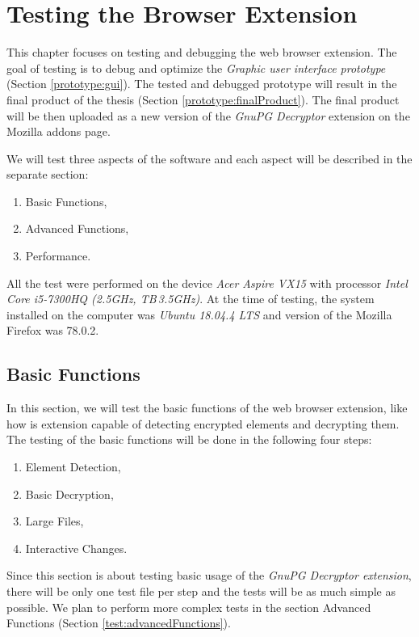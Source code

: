 \chapter{Testing the Browser Extension}
\label{test}
This chapter focuses on testing and debugging the web browser extension. The goal of testing is to debug and optimize the \textit{Graphic user interface prototype} (Section \ref{prototype:gui}). The tested and debugged prototype will result in the final product of the thesis (Section \ref{prototype:finalProduct}). The final product will be then uploaded as a new version of the \textit{GnuPG Decryptor} extension on the Mozilla addons page.

We will test three aspects of the software and each aspect will be described in the separate section:
\begin{enumerate}
    \item Basic Functions,
    \item Advanced Functions,
    \item Performance.
\end{enumerate}

All the test were performed on the device \textit{Acer Aspire VX15} with processor \textit{Intel Core i5-7300HQ (2.5GHz, TB\,3.5GHz)}. At the time of testing, the system installed on the computer was \textit{Ubuntu 18.04.4 LTS} and version of the Mozilla Firefox was 78.0.2.

\section{Basic Functions}
In this section, we will test the basic functions of the web browser extension, like how is extension capable of detecting encrypted elements and decrypting them. The testing  of the basic functions will be done in the following four steps:
\begin{enumerate}
    \item Element Detection,
    \item Basic Decryption,
    \item Large Files,
    \item Interactive Changes.
\end{enumerate}

Since this section is about testing basic usage of the \textit{GnuPG Decryptor extension}, there will be only one test file per step and the tests will be as much simple as possible. We plan to perform more complex tests in the section Advanced Functions (Section \ref{test:advancedFunctions}).

